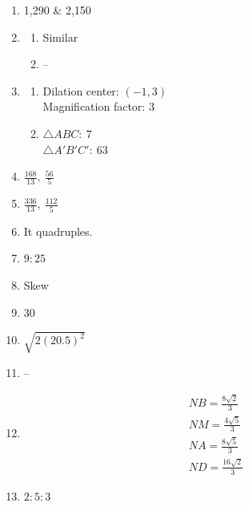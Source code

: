 \documentclass{article}
\begin{document}
\begin{enumerate}
\item 1,290 \& 2,150

\item

	\begin{enumerate}
	
	\item Similar
	
	\item --
	
	\end{enumerate}
	
\item

	\begin{enumerate}
	
	\item Dilation center: $(-1, 3)$ \\
		Magnification factor: 3
		
	\item $\triangle ABC: \ 7$ \\
		$\triangle A'B'C': \ 63$
	
	\end{enumerate}
	
\item $\frac{168}{13}, \ \frac{56}{5}$

\item $\frac{336}{13}, \ \frac{112}{5}$

\item It quadruples.

\item $9:25$

\item Skew

\item 30

\item $\sqrt{2(20.5)^2}$

\item --

\item

	\begin{gather*}
	NB = \frac{8\sqrt{2}}{3} \\
	NM = \frac{4\sqrt{5}}{3} \\
	NA = \frac{8\sqrt{5}}{3} \\
	ND = \frac{16\sqrt{2}}{3}
	\end{gather*}
	
\item $2:5:3$
	
\end{enumerate}
\end{document}
